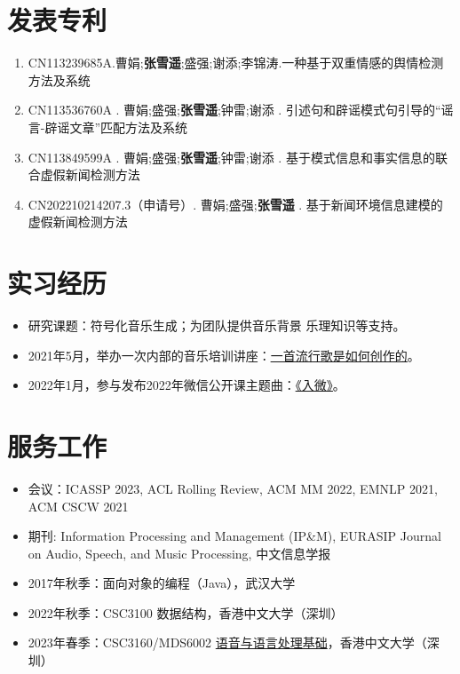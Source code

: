 \documentclass{resume}
\begin{document}
\section{发表专利}
\small{
  \begin{enumerate}\itemsep 0.5em
    \item CN113239685A.曹娟;\textbf{张雪遥};盛强;谢添;李锦涛.一种基于双重情感的舆情检测方法及系统
    \item CN113536760A . 曹娟;盛强;\textbf{张雪遥};钟雷;谢添 . 引述句和辟谣模式句引导的“谣言-辟谣文章”匹配方法及系统
    \item CN113849599A . 曹娟;盛强;\textbf{张雪遥};钟雷;谢添 . 基于模式信息和事实信息的联合虚假新闻检测方法
    \item CN202210214207.3（申请号）. 曹娟;盛强;\textbf{张雪遥} . 基于新闻环境信息建模的虚假新闻检测方法
  \end{enumerate}
}


\section{实习经历}
{\small {}
}
\begin{itemize}
  \item 研究课题：符号化音乐生成；为团队提供音乐背景
  乐理知识等支持。
  \item 2021年5月，举办一次内部的音乐培训讲座：\href{https://www.zhangxueyao.com/data/wcpr-pop-music.pdf}{\underline{一首流行歌是如何创作的}}。
  \item 2022年1月，参与发布2022年微信公开课主题曲：\href{https://y.qq.com/n/ryqq/songDetail/000xeNJ53orPG2}{\underline{《入微》}}。
\end{itemize}

\section{服务工作}
\begin{itemize}
  \item 会议：ICASSP 2023, ACL Rolling Review, ACM MM 2022, EMNLP 2021, ACM CSCW 2021
  \item 期刊: Information Processing and Management (IP\&M), EURASIP Journal on Audio, Speech, and Music Processing, 中文信息学报
\end{itemize}
\begin{itemize}
  \item 2017年秋季：面向对象的编程（Java），武汉大学
  \item 2022年秋季：CSC3100 数据结构，香港中文大学（深圳）
  \item 2023年春季：CSC3160/MDS6002 \href{https://drwuz.com/CSC3160/index.html}{语音与语言处理基础}，香港中文大学（深圳）
\end{itemize}
\end{document}
